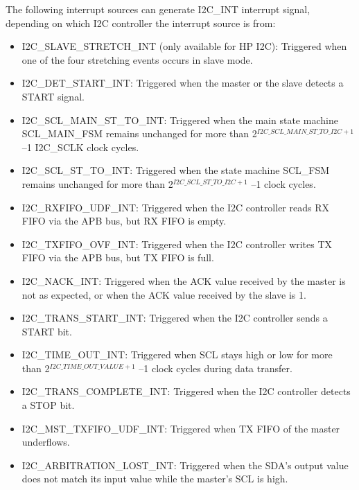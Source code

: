 \documentclass[main\_\_EN.tex]{subfiles}
\begin{document}
The following interrupt sources can generate I2C\_INT interrupt signal, depending on which I2C controller the interrupt source is from:


\begin{itemize}
\item \label{int:i2c-slave-stretch}I2C\_SLAVE\_STRETCH\_INT (only available for HP I2C): Triggered when one of the four stretching events occurs in slave mode.
\item \label{int:i2c-start}I2C\_DET\_START\_INT: Triggered when the master or the slave detects a START signal.
\item \label{int:i2c-scl-main-fsm}I2C\_SCL\_MAIN\_ST\_TO\_INT: Triggered when the main state machine SCL\_MAIN\_FSM remains unchanged for more than 2$^{ \hyperref[fielddesc:I2CSCLMAINSTTOI2C]{I2C\_SCL\_MAIN\_ST\_TO\_I2C} +1}$ –1 I2C\_SCLK clock cycles.
\item \label{int:i2c-scl-fsm}I2C\_SCL\_ST\_TO\_INT: Triggered when the state machine SCL\_FSM remains unchanged for more than 2$^{\hyperref[fielddesc:I2CSCLSTTOI2C]{I2C\_SCL\_ST\_TO\_I2C}+1}$ –1 clock cycles.
\item \label{int:i2c-rxfifo-udf}I2C\_RXFIFO\_UDF\_INT: Triggered when the I2C controller reads RX FIFO via the APB bus, but RX FIFO is empty.
\item \label{int:i2c-txfifo-ovf}I2C\_TXFIFO\_OVF\_INT: Triggered when the I2C controller writes TX FIFO via the APB bus, but TX FIFO is full.
\item \label{int:i2c-nack}I2C\_NACK\_INT: Triggered when the ACK value received by the master is not as expected, or when the ACK value received by the slave is 1.
\item \label{int:i2c-trans-start}I2C\_TRANS\_START\_INT: Triggered when the I2C controller sends a START bit.
\item \label{int:i2c-time-out}I2C\_TIME\_OUT\_INT: Triggered when SCL stays high or low for more than 2$^{\hyperref[fielddesc:I2CTIMEOUTVALUE]{I2C\_TIME\_OUT\_VALUE} +1}$ –1 clock cycles during data transfer.
\item \label{int:i2c-trans-complete}I2C\_TRANS\_COMPLETE\_INT: Triggered when the I2C controller detects a STOP bit.
\item \label{int:i2c-mst-txfifo-udf}I2C\_MST\_TXFIFO\_UDF\_INT: Triggered when TX FIFO of the master underflows.
\item \label{int:i2c-arbitration-lost}I2C\_ARBITRATION\_LOST\_INT: Triggered when the SDA’s output value does not match its input value while the master’s SCL is high.

\end{itemize}
\end{document}
